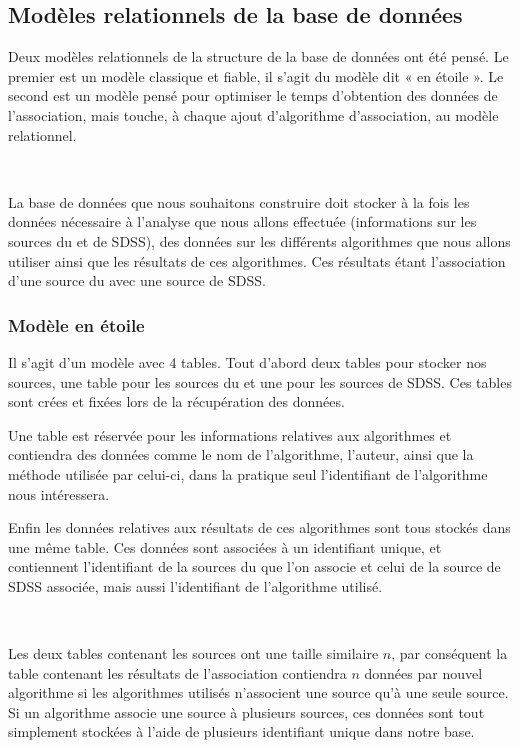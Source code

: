 	\subsection{Modèles relationnels de la base de données}

Deux modèles relationnels de la structure de la base de données ont été pensé. Le premier est un modèle classique et fiable, il s'agit du modèle dit « en étoile ». Le second est un modèle pensé pour optimiser le temps d'obtention des données de l'association, mais touche, à chaque ajout d'algorithme d'association, au modèle relationnel.

\ 

La base de données que nous souhaitons construire doit stocker à la fois les données nécessaire à l'analyse que nous allons effectuée (informations sur les sources du \stack{} et de SDSS), des données sur les différents algorithmes que nous allons utiliser ainsi que les résultats de ces algorithmes. Ces résultats étant l'association d'une source du \stack{} avec une source de SDSS.

		\subsubsection{Modèle en étoile}

Il s'agit d'un modèle avec 4 tables. Tout d'abord deux tables pour stocker nos sources, une table pour les sources du \stack{} et une pour les sources de SDSS. Ces tables sont crées et fixées lors de la récupération des données.

Une table est réservée pour les informations relatives aux algorithmes et contiendra des données comme le nom de l'algorithme, l'auteur, ainsi que la méthode utilisée par celui-ci, dans la pratique seul l'identifiant de l'algorithme nous intéressera.

Enfin les données relatives aux résultats de ces algorithmes sont tous stockés dans une même table. Ces données sont associées à un identifiant unique, et contiennent l'identifiant de la sources du \stack{} que l'on associe et celui de la source de SDSS associée, mais aussi l'identifiant de l'algorithme utilisé.

\ 

Les deux tables contenant les sources ont une taille similaire $n$, par conséquent la table contenant les résultats de l'association contiendra $n$ données par nouvel algorithme si les algorithmes utilisés n'associent une source qu'à une seule source. Si un algorithme associe une source à plusieurs sources, ces données sont tout simplement stockées à l'aide de plusieurs identifiant unique dans notre base.


